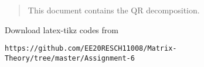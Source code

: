 \documentclass[journal,12pt,twocolumn]{IEEEtran}
\begin{document}
% 
\maketitle
\newpage
\bigskip
\renewcommand{\thefigure}{\theenumi}
\renewcommand{\thetable}{\theenumi}
%
%
\begin{abstract}
This document contains the QR decomposition.
\end{abstract}
Download latex-tikz codes from 
%
\begin{lstlisting}
https://github.com/EE20RESCH11008/Matrix-Theory/tree/master/Assignment-6
\end{lstlisting}
\end{document}
